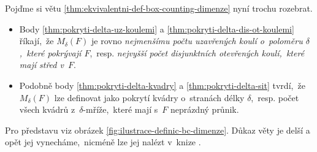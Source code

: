 Pojďme si větu \ref{thm:ekvivalentni-def-box-counting-dimenze} nyní trochu rozebrat.
\begin{itemize}
    \item Body \ref{thm:pokryti-delta-uz-koulemi} a \ref{thm:pokryti-delta-dis-ot-koulemi} říkají,~že $M_\delta(F)$ je rovno \emph{nejmenšímu počtu uzavřených koulí o~poloměru $\delta$,~které pokrývají $F$},~resp. \emph{nejvyšší počet disjunktních otevřených koulí,~které mají střed v~$F$}.
    \item Podobně body \ref{thm:pokryti-delta-kvadry} a \ref{thm:pokryti-delta-sit} tvrdí,~že $M_\delta(F)$ lze definovat jako pokrytí kvádry o~stranách délky $\delta$,~resp. počet všech kvádrů z~$\delta$-mříže,~které mají s~$F$ neprázdný průnik.
\end{itemize}
Pro představu viz obrázek \ref{fig:ilustrace-definic-bc-dimenze}. Důkaz věty je delší a opět jej vynecháme,~nicméně lze jej nalézt v~knize \citep[str. 30]{Falconer2014}.

